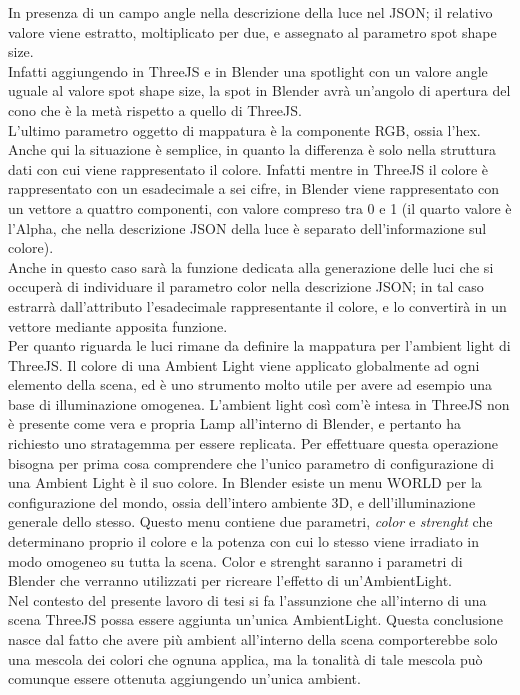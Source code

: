 In presenza di un campo angle nella descrizione della luce nel JSON; il relativo valore viene estratto, moltiplicato per due, e assegnato al parametro spot shape size. 
\\
Infatti aggiungendo in ThreeJS e in Blender una spotlight con un valore angle uguale al valore spot shape size, la spot in Blender avrà un’angolo di apertura del cono che è la metà rispetto a quello di ThreeJS.
\\
L’ultimo parametro oggetto di mappatura è la componente RGB, ossia l’hex. Anche qui la situazione è semplice, in quanto la differenza è solo nella struttura dati con cui viene rappresentato il colore. Infatti mentre in ThreeJS il colore è rappresentato con un esadecimale a sei cifre, in Blender viene rappresentato con un vettore a quattro componenti, con valore compreso tra 0 e 1 (il quarto valore è l’Alpha, che nella descrizione JSON della luce è separato dell’informazione sul colore). 
\\
Anche in questo caso sarà la funzione dedicata alla generazione delle luci che si occuperà di individuare il parametro color nella descrizione JSON; in tal caso estrarrà dall’attributo l’esadecimale rappresentante il colore, e lo convertirà in un vettore mediante apposita funzione. 
\\
Per quanto riguarda le luci rimane da definire la mappatura per l’ambient light di ThreeJS.
Il colore di una Ambient Light viene applicato globalmente ad ogni elemento della scena, ed è uno strumento molto utile per avere ad esempio una base di illuminazione omogenea. L’ambient light così com’è intesa in ThreeJS non è presente come vera e propria Lamp all’interno di Blender, e pertanto ha richiesto uno stratagemma per essere replicata. Per effettuare questa operazione bisogna per prima cosa comprendere che l’unico parametro di configurazione di una Ambient Light è il suo colore. In Blender esiste un menu WORLD per la configurazione del mondo, ossia dell’intero ambiente 3D, e dell’illuminazione generale dello stesso. Questo menu contiene due parametri, \emph{color} e \emph{strenght} che determinano proprio il colore e la potenza con cui lo stesso viene irradiato in modo omogeneo su tutta la scena. Color e strenght saranno i parametri di Blender che verranno utilizzati per ricreare l’effetto di un’AmbientLight.
\\
Nel contesto del presente lavoro di tesi si fa l’assunzione che all’interno di una scena ThreeJS possa essere aggiunta un’unica AmbientLight. Questa conclusione nasce dal fatto che avere più ambient all’interno della scena comporterebbe solo una mescola dei colori che ognuna applica, ma la tonalità di tale mescola può comunque essere ottenuta aggiungendo un’unica ambient.
